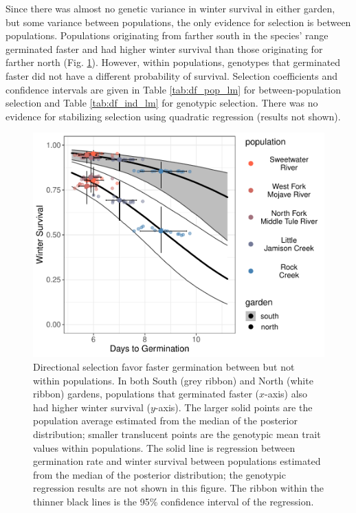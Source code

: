 \documentclass[
  12pt,
]{article}
\begin{document}
Since there was almost no genetic variance in winter survival in either garden, but some variance between populations, the only evidence for selection is between populations. Populations originating from farther south in the species' range germinated faster and had higher winter survival than those originating for farther north (Fig. \ref{fig:selection}). However, within populations, genotypes that germinated faster did not have a different probability of survival. Selection coefficients and confidence intervals are given in Table \ref{tab:df_pop_lm} for between-population selection and Table \ref{tab:df_ind_lm} for genotypic selection. There was no evidence for stabilizing selection using quadratic regression (results not shown).

\begin{figure}[ht]
  \includegraphics[width=\textwidth]{figures/selection.pdf}
  \caption{Directional selection favor faster germination between but not within populations. In both South (grey ribbon) and North (white ribbon) gardens, populations that germinated faster ($x$-axis) also had higher winter survival ($y$-axis). The larger solid points are the population average estimated from the median of the posterior distribution; smaller translucent points are the genotypic mean trait values within populations. The solid line is regression between germination rate and winter survival between populations estimated from the median of the posterior distribution; the genotypic regression results are not shown in this figure. The ribbon within the thinner black lines is the 95\% confidence interval of the regression.}
  \label{fig:selection}
\end{figure}
\end{document}

